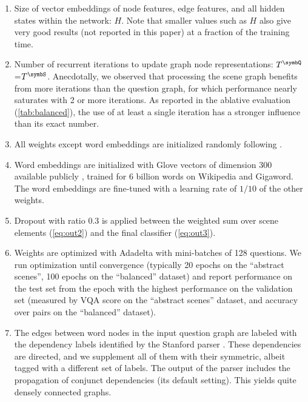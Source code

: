 \begin{enumerate}[topsep=0pt,itemsep=-1ex,partopsep=1ex,parsep=1.5ex,label={\tiny$\bullet$},leftmargin=2.0ex]
\item Size of vector embeddings of node features, edge features, and all hidden states within the network: $H$. Note that smaller values such as $H$ also give very good results (not reported in this paper) at a fraction of the training time.
\item Number of recurrent iterations to update graph node representations: $T^\symbQ$=$T^\symbS$. Anecdotally, we observed that processing the scene graph benefits from more iterations than the question graph, for which performance nearly saturates with 2 or more iterations. As reported in the ablative evaluation (\tab\ref{tab:balanced}), the use of at least a single iteration has a stronger influence than its exact number.
\item All weights except word embeddings are initialized randomly following \cite{glorot2010understanding}.
\item Word embeddings are initialized with Glove vectors \cite{pennington2014glove} of dimension 300 available publicly \cite{gloveWebsite}, trained for 6 billion words on Wikipedia and Gigaword. The word embeddings are fine-tuned with a learning rate of $1/10$ of the other weights.
\item Dropout with ratio 0.3 is applied between the weighted sum over scene elements (\eq\ref{eq:out2}) and the final classifier (\eq\ref{eq:out3}).
\item Weights are optimized with Adadelta \cite{zeiler2012adadelta} with mini-batches of 128 questions. We run optimization until convergence (typically 20 epochs on the ``abstract scenes'', 100 epochs on the ``balanced'' dataset) and report performance on the test set from the epoch with the highest performance on the validation set (measured by VQA score on the ``abstract scenes'' dataset, and accuracy over pairs on the ``balanced'' dataset).

\item The edges between word nodes in the input question graph are labeled with the dependency labels identified by the Stanford parser \cite{demarneffe2008parser,stanfordParserWebsite}. These dependencies are directed, and we supplement all of them with their symmetric, albeit tagged with a different set of labels. The output of the parser includes the propagation of conjunct dependencies (its default setting). This yields quite densely connected graphs.


\end{enumerate}

